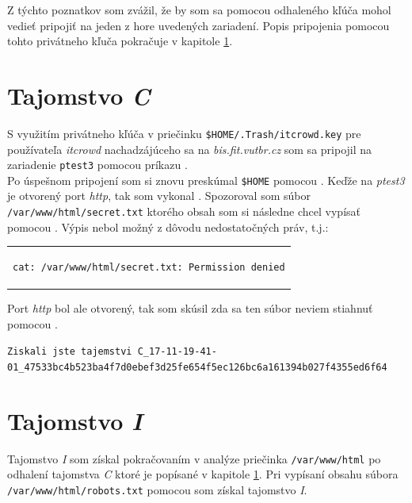 \documentclass[11pt,a4paper]{article}
\begin{document}
Z týchto poznatkov som zvážil, že by som sa pomocou odhaleného kľúča mohol vedieť pripojiť na jeden z hore uvedených zariadení. Popis pripojenia pomocou tohto privátneho kľuča pokračuje v kapitole \ref{sec:C}.

\section{Tajomstvo \textit{C}}\label{sec:C}

S využitím privátneho kľúča v priečinku \texttt{\$HOME/.Trash/itcrowd.key} pre používateľa \textit{itcrowd} nachadzájúceho sa na \textit{bis.fit.vutbr.cz} som sa pripojil na zariadenie \texttt{ptest3} pomocou príkazu .\\

Po úspešnom pripojení som si znovu preskúmal \texttt{\$HOME} pomocou . Keďže na \textit{ptest3} je otvorený port \textit{http}, tak som vykonal . Spozoroval som súbor \texttt{/var/www/html/secret.txt} ktorého obsah som si následne chcel vypísať pomocou . Výpis nebol možný z dôvodu nedostatočných práv, t.j.:

\begin{center}
\begin{tabular}{c}
\begin{lstlisting}[basicstyle=\footnotesize]
cat: /var/www/html/secret.txt: Permission denied
\end{lstlisting}
\end{tabular}
\end{center}

Port \textit{http} bol ale otvorený, tak som skúsil zda sa ten súbor neviem stiahnuť pomocou .

\begin{center}
\small{\texttt{Ziskali jste tajemstvi C\_17-11-19-41-01\_47533bc4b523ba4f7d0ebef3d25fe654f5ec126bc6a161394b027f4355ed6f64}}
\end{center}

\section{Tajomstvo \textit{I}}\label{sec:I}

Tajomstvo \textit{I} som získal pokračovaním v analýze priečinka \texttt{/var/www/html} po odhalení tajomstva \textit{C} ktoré je popísané v kapitole \ref{sec:C}. Pri vypísaní obsahu súbora \texttt{/var/www/html/robots.txt} pomocou  som získal tajomstvo \textit{I}.
\end{document}
